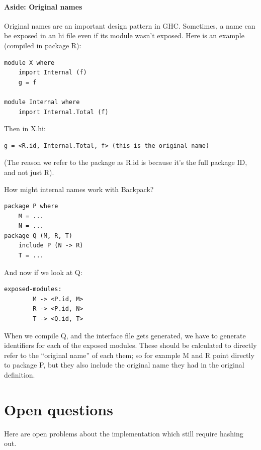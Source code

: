 \documentclass{article}
\begin{document}
\paragraph{Aside: Original names} Original names are an important design pattern
in GHC\@.
Sometimes, a name can be exposed in an hi file even if its module
wasn't exposed. Here is an example (compiled in package R):

\begin{verbatim}
module X where
    import Internal (f)
    g = f

module Internal where
    import Internal.Total (f)
\end{verbatim}

Then in X.hi:

\begin{verbatim}
g = <R.id, Internal.Total, f> (this is the original name)
\end{verbatim}

(The reason we refer to the package as R.id is because it's the
full package ID, and not just R).

How might internal names work with Backpack?

\begin{verbatim}
package P where
    M = ...
    N = ...
package Q (M, R, T)
    include P (N -> R)
    T = ...
\end{verbatim}

And now if we look at Q\@:

\begin{verbatim}
exposed-modules:
        M -> <P.id, M>
        R -> <P.id, N>
        T -> <Q.id, T>
\end{verbatim}

When we compile Q, and the interface file gets generated, we have
to generate identifiers for each of the exposed modules.  These should
be calculated to directly refer to the ``original name'' of each them;
so for example M and R point directly to package P, but they also
include the original name they had in the original definition.


\section{Open questions}\label{sec:open-questions}

Here are open problems about the implementation which still require
hashing out.
\end{document}

